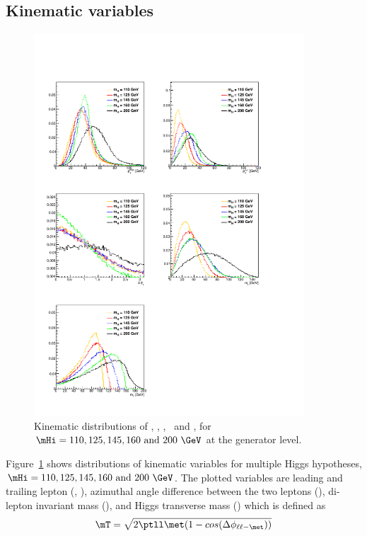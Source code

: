%
\subsection{Kinematic variables}
\label{subsec:kinimetic_variables}

\begin{figure}[htp]
\centering
\includegraphics[width=0.9\textwidth]{figures/hww_gen_all.pdf}
\caption{Kinematic distributions of \ptlmax, \ptlmin, \delphill, \mll\ and \mT, 
for $\mHi = 110, 125, 145, 160\textrm{ and } 200~\GeV$ at the generator level.}
\label{fig:genhww}
\end{figure}
Figure~\ref{fig:genhww} shows distributions of kinematic variables for 
multiple Higgs hypotheses, $\mHi = 110, 125, 145, 160\textrm{ and } 200~\GeV$. 
The plotted variables are leading and trailing lepton \pt (\ptlmax, \ptlmin), 
azimuthal angle difference between the two leptons (\delphill), 
di-lepton invariant mass (\mll), and Higgs transverse mass (\mT) which is 
defined as 
\begin{eqnarray} 
\mT = \sqrt{2\ptll\met(1-cos(\Delta\phi_{\ell\ell-\met}))}
\end{eqnarray} 
